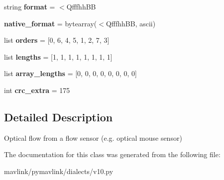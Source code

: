 \begin{DoxyCompactItemize}
\mbox{\label{classpymavlink_1_1dialects_1_1v10_1_1MAVLink__optical__flow__message_aec7f3d0fef849b9ddf3cce18c6d8af7a}} 
string {\bfseries format} = \textquotesingle{}$<$Qfffhh\+BB\textquotesingle{}
\item 
\mbox{\label{classpymavlink_1_1dialects_1_1v10_1_1MAVLink__optical__flow__message_accf8325d789f7069c33112ab0e212793}} 
{\bfseries native\+\_\+format} = bytearray(\textquotesingle{}$<$Qfffhh\+BB\textquotesingle{}, \textquotesingle{}ascii\textquotesingle{})
\item 
\mbox{\label{classpymavlink_1_1dialects_1_1v10_1_1MAVLink__optical__flow__message_a87bfcfa2db11c2057d9745f60f5ac1a1}} 
list {\bfseries orders} = \mbox{[}0, 6, 4, 5, 1, 2, 7, 3\mbox{]}
\item 
\mbox{\label{classpymavlink_1_1dialects_1_1v10_1_1MAVLink__optical__flow__message_a7f7a4a176b1792b419dac0e1ab404867}} 
list {\bfseries lengths} = \mbox{[}1, 1, 1, 1, 1, 1, 1, 1\mbox{]}
\item 
\mbox{\label{classpymavlink_1_1dialects_1_1v10_1_1MAVLink__optical__flow__message_ac2f08ea6bd099596494f16914dfe8814}} 
list {\bfseries array\+\_\+lengths} = \mbox{[}0, 0, 0, 0, 0, 0, 0, 0\mbox{]}
\item 
\mbox{\label{classpymavlink_1_1dialects_1_1v10_1_1MAVLink__optical__flow__message_a486f53780899afdaa0c7f23358f50b40}} 
int {\bfseries crc\+\_\+extra} = 175
\end{DoxyCompactItemize}


\subsection{Detailed Description}
\begin{DoxyVerb}Optical flow from a flow sensor (e.g. optical mouse sensor)
\end{DoxyVerb}
 

The documentation for this class was generated from the following file\+:\begin{DoxyCompactItemize}
\item 
mavlink/pymavlink/dialects/v10.\+py\end{DoxyCompactItemize}
